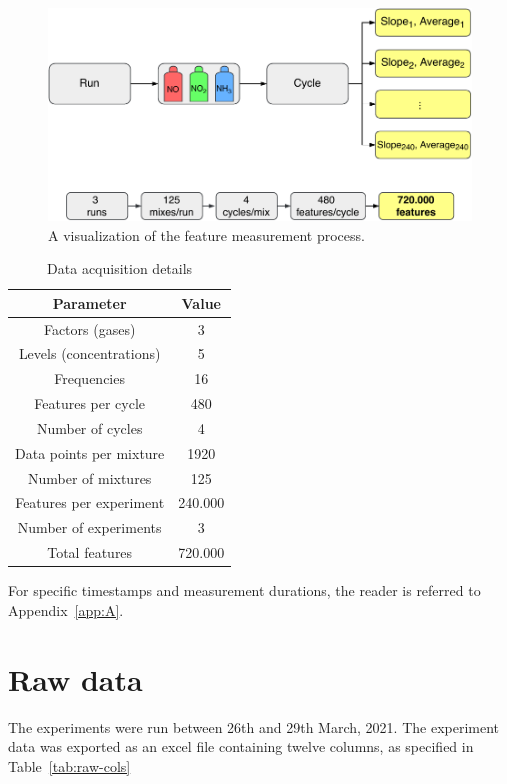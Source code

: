 \begin{figure}[h]
	\centering
	\includegraphics[width=1\textwidth]{../figures/features.pdf}
	\caption{A visualization of the feature measurement process.}
	\label{fig:features}
\end{figure}

\begin{table}[h]
	\centering
	\caption{Data acquisition details}
	\label{tab:measurements}
	\begin{tabular}{|c|c|}
		\hline
		\textbf{Parameter} & \textbf{Value} \\
		\hline
		Factors (gases) & 3 \\
		\hline
		Levels (concentrations) & 5 \\
		\hline
		Frequencies & 16 \\
		\hline
		Features per cycle & 480 \\
		\hline
		Number of cycles & 4 \\
		\hline
		Data points per mixture & 1920\\
		\hline
		Number of mixtures & 125 \\
		\hline
		Features per experiment & 240.000 \\
		\hline
		Number of experiments & 3 \\
		\hline
		Total features & 720.000 \\
		\hline
	\end{tabular}
\end{table}

For specific timestamps and measurement durations, the reader is referred to Appendix~\ref{app:A}.

\section{Raw data}
\label{sec:raw-data}

The experiments were run between 26th and 29th March, 2021. The experiment data was exported as an excel file containing twelve columns, as specified in Table~\ref{tab:raw-cols}


